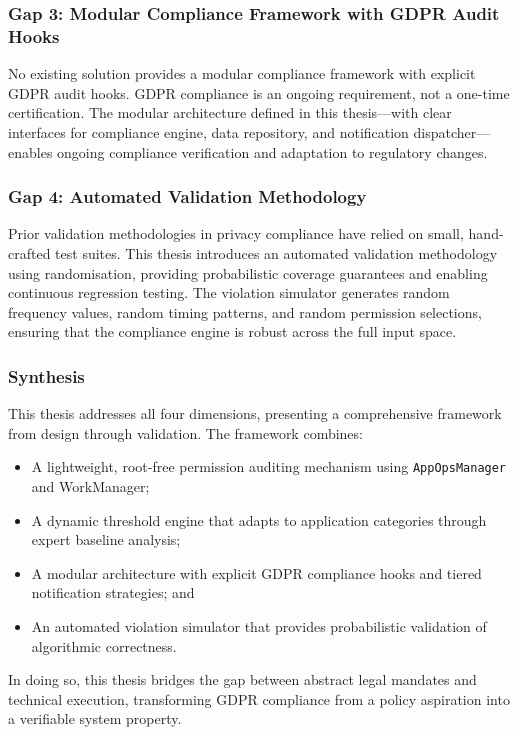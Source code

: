 \subsubsection{Gap 3: Modular Compliance Framework with GDPR Audit Hooks}
No existing solution provides a modular compliance framework with explicit GDPR audit hooks. GDPR compliance is an ongoing requirement, not a one-time certification. The modular architecture defined in this thesis—with clear interfaces for compliance engine, data repository, and notification dispatcher—enables ongoing compliance verification and adaptation to regulatory changes.

\subsubsection{Gap 4: Automated Validation Methodology}
Prior validation methodologies in privacy compliance have relied on small, hand-crafted test suites. This thesis introduces an automated validation methodology using randomisation, providing probabilistic coverage guarantees and enabling continuous regression testing. The violation simulator generates random frequency values, random timing patterns, and random permission selections, ensuring that the compliance engine is robust across the full input space.

\subsubsection{Synthesis}
This thesis addresses all four dimensions, presenting a comprehensive framework from design through validation. The framework combines:
\begin{itemize}
\item A lightweight, root-free permission auditing mechanism using \texttt{AppOpsManager} and WorkManager;
\item A dynamic threshold engine that adapts to application categories through expert baseline analysis;
\item A modular architecture with explicit GDPR compliance hooks and tiered notification strategies; and
\item An automated violation simulator that provides probabilistic validation of algorithmic correctness.
\end{itemize}

In doing so, this thesis bridges the gap between abstract legal mandates and technical execution, transforming GDPR compliance from a policy aspiration into a verifiable system property.

